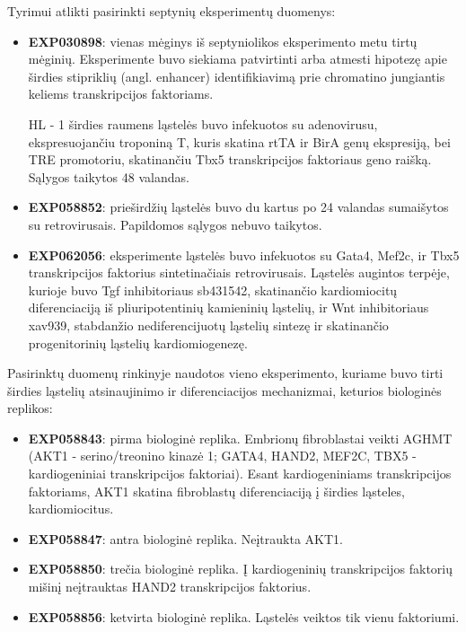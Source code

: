 \documentclass[12pt]{article}
\begin{document}
Tyrimui atlikti pasirinkti septynių eksperimentų duomenys:

\begin{itemize}
    \item \textbf{EXP030898}: vienas mėginys iš septyniolikos eksperimento
        metu tirtų mėginių. Eksperimente buvo siekiama patvirtinti arba
        atmesti hipotezę apie širdies stipriklių (angl. enhancer)
        identifikiavimą prie chromatino jungiantis keliems transkripcijos
        faktoriams.

        HL - 1 širdies raumens ląstelės buvo infekuotos
        su adenovirusu, ekspresuojančiu troponiną T, kuris skatina rtTA ir
        BirA genų ekspresiją, bei TRE promotoriu, skatinančiu Tbx5
        transkripcijos faktoriaus geno raišką. Sąlygos taikytos 48 valandas.
    \item \textbf{EXP058852}: prieširdžių ląstelės buvo du kartus po 24
        valandas sumaišytos su retrovirusais. Papildomos sąlygos nebuvo
        taikytos.
    \item \textbf{EXP062056}: eksperimente ląstelės buvo infekuotos su
        Gata4, Mef2c, ir Tbx5 transkripcijos faktorius sintetinačiais
        retrovirusais. Ląstelės augintos terpėje, kurioje buvo {Tgf\textbeta}
        inhibitoriaus sb431542, skatinančio kardiomiocitų diferenciaciją
        iš pliuripotentinių kamieninių ląstelių, ir Wnt inhibitoriaus
        xav939, stabdanžio nediferencijuotų ląstelių sintezę ir
        skatinančio progenitorinių ląstelių kardiomiogenezę.
\end{itemize}

Pasirinktų duomenų rinkinyje naudotos vieno eksperimento, kuriame buvo
tirti širdies ląstelių atsinaujinimo ir diferenciacijos mechanizmai,
keturios biologinės replikos:

\begin{itemize}
    \item \textbf{EXP058843}: pirma biologinė replika. Embrionų fibroblastai
        veikti AGHMT (AKT1 - serino/treonino kinazė 1; GATA4,
        HAND2, MEF2C, TBX5 - kardiogeniniai transkripcijos faktoriai). Esant
        kardiogeniniams transkripcijos faktoriams, AKT1 skatina fibroblastų
        diferenciaciją į širdies ląsteles, kardiomiocitus.
    \item \textbf{EXP058847}: antra biologinė replika. Neįtraukta AKT1.
    \item \textbf{EXP058850}: trečia biologinė replika. Į kardiogeninių
        transkripcijos faktorių mišinį neįtrauktas HAND2 transkripcijos
        faktorius.
    \item \textbf{EXP058856}: ketvirta biologinė replika. Ląstelės
        veiktos tik vienu faktoriumi.
  \end{itemize}
\newpage
\end{document}

